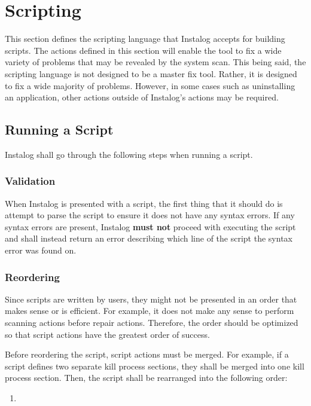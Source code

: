 \section{Scripting}
This section defines the scripting language that Instalog accepts for building
scripts.  The actions defined in this section will enable the tool to fix a wide
variety of problems that may be revealed by the system scan.  This being said,
the scripting language is not designed to be a master fix tool.  Rather, it is
designed to fix a wide majority of problems.  However, in some cases such as
uninstalling an application, other actions outside of Instalog's actions may be
required. 

\subsection{Running a Script}
Instalog shall go through the following steps when running a script.  
\subsubsection{Validation}
When Instalog is presented with a script, the first thing that it should do is
attempt to parse the script to ensure it does not have any syntax errors.  If
any syntax errors are present, Instalog \textbf{must not} proceed with executing
the script and shall instead return an error describing which line of the script
the syntax error was found on.
\subsubsection{Reordering}
Since scripts are written by users, they might not be presented in an order that
makes sense or is efficient.  For example, it does not make any sense to
perform scanning actions before repair actions.  Therefore, the order should be
optimized so that script actions have the greatest order of success.

Before reordering the script, script actions must be merged.  For example, if a
script defines two separate kill process sections, they shall be merged into one
kill process section.  Then, the script shall be rearranged into the following
order:
\begin{enumerate}
  \item 
\end{enumerate}
